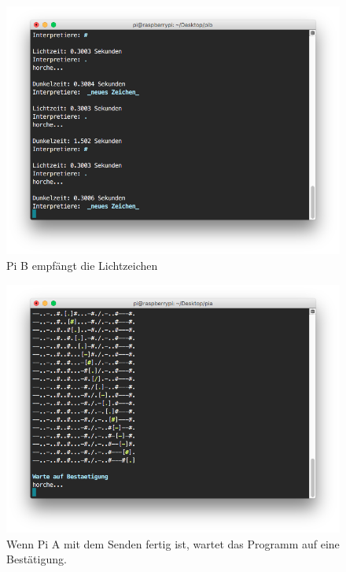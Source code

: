 \documentclass[12pt, a4paper]{article}
\begin{document}
\newpage
\begin{figure}[H]
	\centering
	\includegraphics[width=1.0\textwidth]{sshot_17.png}
	\caption{Pi B empfängt die Lichtzeichen}
\end{figure}

\newpage
\begin{figure}[H]
	\centering
	\includegraphics[width=1.0\textwidth]{sshot_21.png}
	\caption{Wenn Pi A mit dem Senden fertig ist, wartet das Programm auf eine Bestätigung.}
\end{figure}
\end{document}
